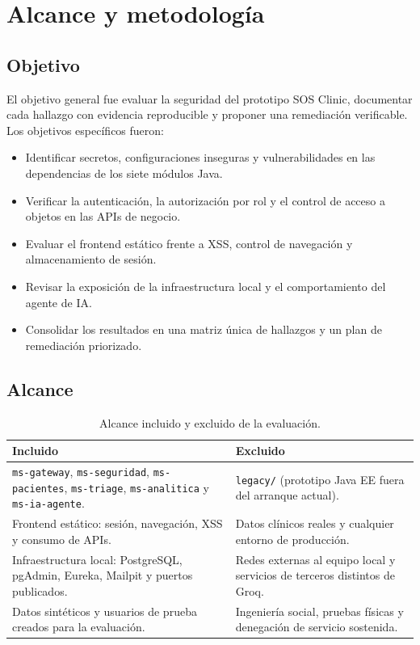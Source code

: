 \section{Alcance y metodología}
\label{sec:alcance}

\subsection{Objetivo}

El objetivo general fue evaluar la seguridad del prototipo SOS Clinic, documentar
cada hallazgo con evidencia reproducible y proponer una remediación verificable.
Los objetivos específicos fueron:

\begin{itemize}
  \item Identificar secretos, configuraciones inseguras y vulnerabilidades en las
  dependencias de los siete módulos Java.
  \item Verificar la autenticación, la autorización por rol y el control de acceso
  a objetos en las APIs de negocio.
  \item Evaluar el frontend estático frente a XSS, control de navegación y
  almacenamiento de sesión.
  \item Revisar la exposición de la infraestructura local y el comportamiento del
  agente de IA.
  \item Consolidar los resultados en una matriz única de hallazgos y un plan de
  remediación priorizado.
\end{itemize}

\subsection{Alcance}

\begin{table}[htbp]
\centering
\caption{Alcance incluido y excluido de la evaluación.}
\label{tab:alcance}
\begin{tabular}{@{}L{7.6cm}L{7.6cm}@{}}
\toprule
\textbf{Incluido} & \textbf{Excluido}\\
\midrule
\texttt{ms-gateway}, \texttt{ms-seguridad}, \texttt{ms-pacientes},
\texttt{ms-triage}, \texttt{ms-analitica} y \texttt{ms-ia-agente}. &
\texttt{legacy/} (prototipo Java EE fuera del arranque actual).\\
Frontend estático: sesión, navegación, XSS y consumo de APIs. &
Datos clínicos reales y cualquier entorno de producción.\\
Infraestructura local: PostgreSQL, pgAdmin, Eureka, Mailpit y puertos publicados. &
Redes externas al equipo local y servicios de terceros distintos de Groq.\\
Datos sintéticos y usuarios de prueba creados para la evaluación. &
Ingeniería social, pruebas físicas y denegación de servicio sostenida.\\
\bottomrule
\end{tabular}
\end{table}

